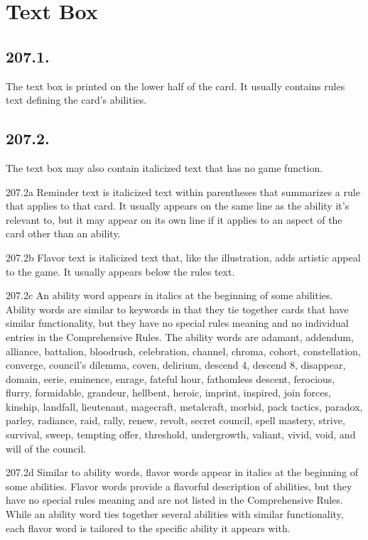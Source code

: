 \section{Text Box}
\subsection*{207.1.}
The text box is printed on the lower half of the card. It usually contains rules text defining the card’s abilities.

\subsection*{207.2.}
The text box may also contain italicized text that has no game function.

207.2a Reminder text is italicized text within parentheses that summarizes a rule that applies to that card. It usually appears on the same line as the ability it’s relevant to, but it may appear on its own line if it applies to an aspect of the card other than an ability.

207.2b Flavor text is italicized text that, like the illustration, adds artistic appeal to the game. It usually appears below the rules text.

207.2c An ability word appears in italics at the beginning of some abilities. Ability words are similar to keywords in that they tie together cards that have similar functionality, but they have no special rules meaning and no individual entries in the Comprehensive Rules. The ability words are adamant, addendum, alliance, battalion, bloodrush, celebration, channel, chroma, cohort, constellation, converge, council’s dilemma, coven, delirium, descend 4, descend 8, disappear, domain, eerie, eminence, enrage, fateful hour, fathomless descent, ferocious, flurry, formidable, grandeur, hellbent, heroic, imprint, inspired, join forces, kinship, landfall, lieutenant, magecraft, metalcraft, morbid, pack tactics, paradox, parley, radiance, raid, rally, renew, revolt, secret council, spell mastery, strive, survival, sweep, tempting offer, threshold, undergrowth, valiant, vivid, void, and will of the council.

207.2d Similar to ability words, flavor words appear in italics at the beginning of some abilities. Flavor words provide a flavorful description of abilities, but they have no special rules meaning and are not listed in the Comprehensive Rules. While an ability word ties together several abilities with similar functionality, each flavor word is tailored to the specific ability it appears with.

